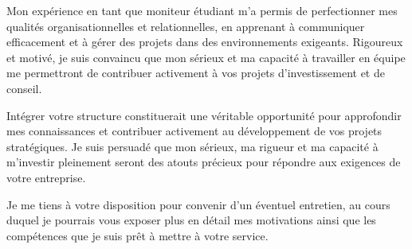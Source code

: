 \documentclass[11pt,a4paper,french]{moderncv}        %
\begin{document}
Mon expérience en tant que moniteur étudiant m’a permis de perfectionner mes qualités organisationnelles et relationnelles, en apprenant à communiquer efficacement et à gérer des projets dans des environnements exigeants. Rigoureux et motivé, je suis convaincu que mon sérieux et ma capacité à travailler en équipe me permettront de contribuer activement à vos projets d’investissement et de conseil.

Intégrer votre structure constituerait une véritable opportunité pour approfondir mes connaissances et contribuer activement au développement de vos projets stratégiques. Je suis persuadé que mon sérieux, ma rigueur et ma capacité à m’investir pleinement seront des atouts précieux pour répondre aux exigences de votre entreprise.

Je me tiens à votre disposition pour convenir d’un éventuel entretien, au cours duquel je pourrais vous exposer plus en détail mes motivations ainsi que les compétences que je suis prêt à mettre à votre service.












\makeletterclosing
\end{document}
